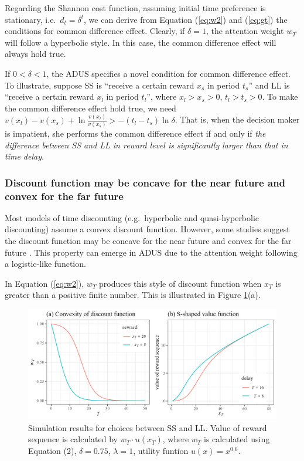 \documentclass[
  12pt,
]{article}
\begin{document}
Regarding the Shannon cost function, assuming initial time preference is
stationary, i.e.~\(d_t=\delta^t\), we can derive from Equation
(\ref{eq:w2}) and (\ref{eq:gt}) the conditions for common difference
effect. Clearly, if \(\delta=1\), the attention weight \(w_T\) will
follow a hyperbolic style. In this case, the common difference effect
will always hold true.

If \(0<\delta<1\), the ADUS specifies a novel condition for common
difference effect. To illustrate, suppose SS is ``receive a certain
reward \(x_s\) in period \(t_s\)'' and LL is ``receive a certain reward
\(x_l\) in period \(t_l\)'', where \(x_l>x_s>0\), \(t_l>t_s>0\). To make
the common difference effect hold true, we need
\(v(x_l)-v(x_s)+\ln\frac{v(x_l)}{v(x_s)}>-(t_l-t_s)\ln\delta\). That is,
when the decision maker is impatient, she performs the common difference
effect if and only if \emph{the difference between SS and LL in reward
level is significantly larger than that in time delay}.

\hypertarget{discount-function-may-be-concave-for-the-near-future-and-convex-for-the-far-future}{%
\subsubsection{Discount function may be concave for the near future and
convex for the far
future}\label{discount-function-may-be-concave-for-the-near-future-and-convex-for-the-far-future}}

Most models of time discounting (e.g.~hyperbolic and quasi-hyperbolic
discounting) assume a convex discount function. However, some studies
suggest the discount function may be concave for the near future and
convex for the far future
\citep{onay_intertemporal_2007, takeuchi_non-parametric_2011, dejarnette_time_2020}.
This property can emerge in ADUS due to the attention weight following a
logistic-like function.

In Equation (\ref{eq:w2}), \(w_T\) produces this style of discount
function when \(x_T\) is greater than a positive finite number. This is
illustrated in Figure \ref{fig:plot-discount-value}(a).

\begin{figure}
  \centering
  \includegraphics{images/plot-discount-value.png}
  \caption{Simulation results for choices between SS and LL. Value of reward sequence is calculated by $w_T\cdot u(x_T)$, where $w_T$ is calculated using Equation (2), $\delta=0.75$, $\lambda=1$, utility funtion $u(x)=x^{0.6}$.}
  \label{fig:plot-discount-value}
\end{figure}
\end{document}
